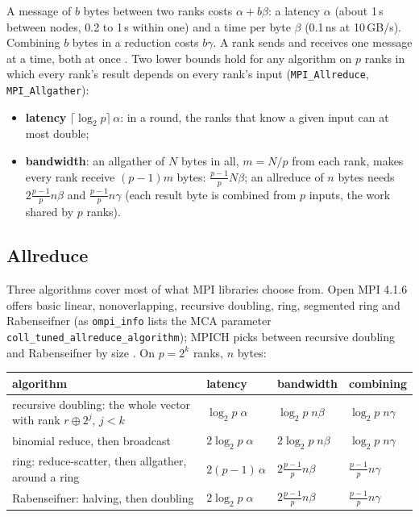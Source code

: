 \documentclass[10pt,a4paper]{article}
\theoremstyle{definition}
\newcommand{\fn}[1]{\texttt{#1}}
\begin{document}
A message of $b$ bytes between two ranks costs $\alpha + b\beta$: a
latency $\alpha$ (about 1\,\textmu s between nodes, 0.2 to 1\,\textmu s
within one) and a time per byte $\beta$ (0.1\,ns at 10\,GB/s). Combining
$b$ bytes in a reduction costs $b\gamma$. A rank sends and receives one
message at a time, both at once \cite{chan, thakur}. Two lower bounds hold
for any algorithm on $p$ ranks in which every rank's result depends on
every rank's input (\fn{MPI\_Allreduce}, \fn{MPI\_Allgather}):
\begin{itemize}
  \item \textbf{latency} $\lceil\log_2 p\rceil\,\alpha$: in a round, the
    ranks that know a given input can at most double;
  \item \textbf{bandwidth}: an allgather of $N$ bytes in all, $m = N/p$
    from each rank, makes every rank receive $(p-1)m$ bytes:
    $\frac{p-1}{p}N\beta$; an allreduce of $n$ bytes needs
    $2\frac{p-1}{p}n\beta$ \cite{patarasuk} and $\frac{p-1}{p}n\gamma$
    (each result byte is combined from $p$ inputs, the work shared by $p$
    ranks).
\end{itemize}

\subsection{Allreduce}

Three algorithms cover most of what MPI libraries choose from. Open MPI
4.1.6 offers basic linear, nonoverlapping, recursive doubling, ring,
segmented ring and Rabenseifner (as \fn{ompi\_info} lists the MCA
parameter \fn{coll\_tuned\_\allowbreak allreduce\_\allowbreak algorithm});
MPICH
picks between recursive doubling and Rabenseifner by size \cite{thakur}.
On $p = 2^k$ ranks, $n$ bytes:

\begin{center}
\small
\begin{tabular}{@{}>{\raggedright}p{6.4cm} l l l@{}}
  \toprule
  algorithm & latency & bandwidth & combining \\
  \midrule
  recursive doubling: the whole vector with rank $r \oplus 2^j$, $j < k$
    & $\log_2 p\;\alpha$ & $\log_2 p\;n\beta$ & $\log_2 p\;n\gamma$ \\
  binomial reduce, then broadcast & $2\log_2 p\;\alpha$ & $2\log_2 p\;n\beta$
    & $\log_2 p\;n\gamma$ \\
  ring: reduce-scatter, then allgather, around a ring & $2(p-1)\,\alpha$
    & $2\frac{p-1}{p}n\beta$ & $\frac{p-1}{p}n\gamma$ \\
  Rabenseifner: halving, then doubling & $2\log_2 p\;\alpha$ &
    $2\frac{p-1}{p}n\beta$ & $\frac{p-1}{p}n\gamma$ \\
  \bottomrule
\end{tabular}
\end{center}
\end{document}
